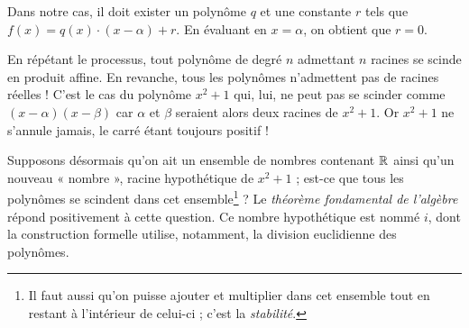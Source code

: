 {	Dans notre cas, il doit exister un polynôme $q$ et une constante $r$ tels que $f(x) = q(x)\cdot(x-\alpha) + r$.
	En évaluant en $x=\alpha$, on obtient que $r=0$.
	
	En répétant le processus, tout polynôme de degré $n$ admettant $n$ racines se scinde en produit affine.
	En revanche, tous les polynômes n'admettent pas de racines réelles !
	C'est le cas du polynôme $x^2 + 1$ qui, lui, ne peut pas se scinder comme $(x-\alpha)(x-\beta)$ car $\alpha$ et $\beta$ seraient alors deux racines de $x^2 + 1$.
	 Or $x^2 + 1$ ne s'annule jamais, le carré étant toujours positif !
	 
	Supposons désormais qu'on ait un ensemble de nombres contenant $\mathbb{R}$ ainsi qu'un nouveau « nombre », racine hypothétique de $x^2 + 1$ ; est-ce que tous les polynômes se scindent dans cet ensemble\footnote{Il faut aussi qu'on puisse ajouter et multiplier dans cet ensemble tout en restant à l'intérieur de celui-ci ; c'est la \emph{stabilité}.} ? 
	Le \emph{théorème fondamental de l'algèbre} répond positivement à cette question.
	Ce nombre hypothétique est nommé $i$, dont la construction formelle utilise, notamment, la division euclidienne des polynômes.
}




